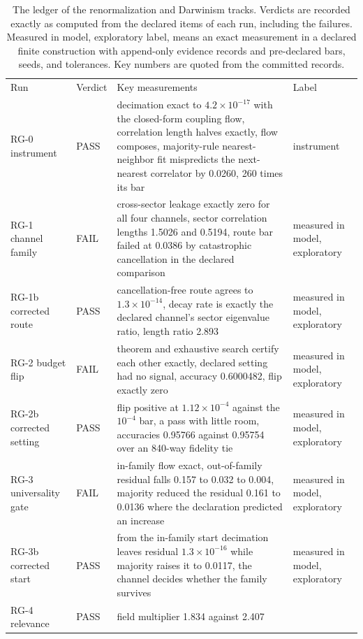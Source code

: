 \documentclass[aps,pre,reprint,nofootinbib,floatfix]{revtex4-2}
\begin{document}
\begin{table}[t]
\caption{The ledger of the renormalization and Darwinism tracks.
Verdicts are recorded exactly as computed from the declared items
of each run, including the failures.  Measured in model,
exploratory label, means an exact measurement in a declared finite
construction with append-only evidence records and pre-declared
bars, seeds, and tolerances.  Key numbers are quoted from the
committed records.}
\label{tab:ledger1}
\begin{ruledtabular}
\begin{tabular}{L{1.7cm}lL{10.6cm}L{2.7cm}}
Run & Verdict & Key measurements & Label \\
\colrule
RG-0 instrument & PASS & decimation exact to $4.2\times10^{-17}$
with the closed-form coupling flow, correlation length halves
exactly, flow composes, majority-rule nearest-neighbor fit
mispredicts the next-nearest correlator by 0.0260, 260 times its
bar & instrument \\
RG-1 channel family & FAIL & cross-sector leakage exactly zero for
all four channels, sector correlation lengths 1.5026 and 0.5194,
route bar failed at 0.0386 by catastrophic cancellation in the
declared comparison & measured in model, exploratory \\
RG-1b corrected route & PASS & cancellation-free route agrees to
$1.3\times10^{-14}$, decay rate is exactly the declared channel's
sector eigenvalue ratio, length ratio 2.893 & measured in model,
exploratory \\
RG-2 budget flip & FAIL & theorem and exhaustive search certify
each other exactly, declared setting had no signal, accuracy
0.6000482, flip exactly zero & measured in model, exploratory \\
RG-2b corrected setting & PASS & flip positive at
$1.12\times10^{-4}$ against the $10^{-4}$ bar, a pass with little
room, accuracies 0.95766 against 0.95754 over an 840-way fidelity
tie & measured in model, exploratory \\
RG-3 universality gate & FAIL & in-family flow exact, out-of-family
residual falls 0.157 to 0.032 to 0.004, majority reduced the
residual 0.161 to 0.0136 where the declaration predicted an
increase & measured in model, exploratory \\
RG-3b corrected start & PASS & from the in-family start decimation
leaves residual $1.3\times10^{-16}$ while majority raises it to
0.0117, the channel decides whether the family survives & measured
in model, exploratory \\
RG-4 relevance & PASS & field multiplier 1.834 against 2.407

\end{tabular}
\end{ruledtabular}
\end{table}
\end{document}
